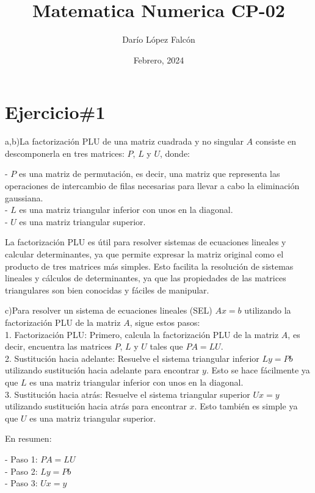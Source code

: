 \documentclass[a4paper,12pt]{article}
\begin{document}
\title{Matematica Numerica CP-02}
\author{Darío López Falcón}
\date{Febrero, 2024}
\maketitle
\section*{Ejercicio\#1}

a,b)La factorización PLU de una matriz cuadrada y no singular \( A \) consiste en descomponerla en tres matrices: \( P \), \( L \) y \( U \), donde:

- \( P \) es una matriz de permutación, es decir, una matriz que representa las operaciones de intercambio de filas necesarias para llevar a cabo la eliminación gaussiana.\\
- \( L \) es una matriz triangular inferior con unos en la diagonal.\\
- \( U \) es una matriz triangular superior.

La factorización PLU es útil para resolver sistemas de ecuaciones lineales y calcular determinantes, ya que permite expresar la matriz original como el producto de tres matrices más simples. 
Esto facilita la resolución de sistemas lineales y cálculos de determinantes, ya que las propiedades de las matrices triangulares son bien conocidas y fáciles de manipular.


c)Para resolver un sistema de ecuaciones lineales (SEL) \( Ax = b \) utilizando la factorización PLU de la matriz \( A \), sigue estos pasos:\\

1. Factorización PLU: Primero, calcula la factorización PLU de la matriz \( A \), es decir, encuentra las matrices \( P \), \( L \) y \( U \) tales que \( PA = LU \).\\

2. Sustitución hacia adelante: Resuelve el sistema triangular inferior \( Ly = Pb \) utilizando sustitución hacia adelante para encontrar \( y \). Esto se hace fácilmente ya que \( L \) es una matriz triangular inferior con unos en la diagonal.\\

3. Sustitución hacia atrás: Resuelve el sistema triangular superior \( Ux = y \) utilizando sustitución hacia atrás para encontrar \( x \). Esto también es simple ya que \( U \) es una matriz triangular superior.

En resumen:

- Paso 1: \( PA = LU \)\\
- Paso 2: \( Ly = Pb \)\\
- Paso 3: \( Ux = y \)\\
\end{document}
